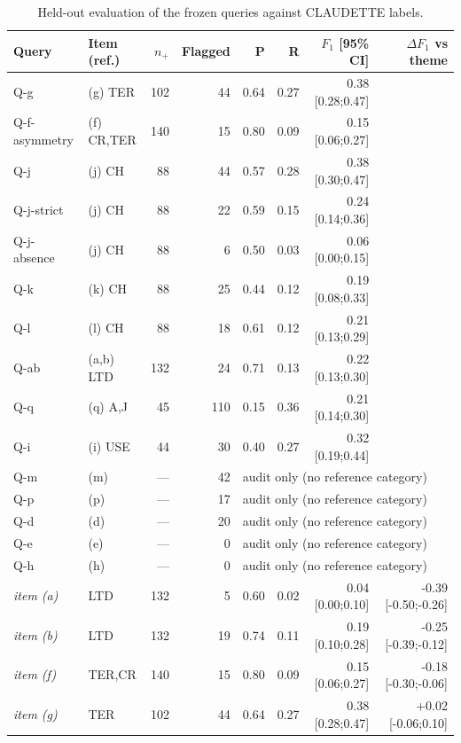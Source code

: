 \begin{table}[t]
\caption{Held-out evaluation of the frozen queries against CLAUDETTE labels.}
\label{tab:queries}
\centering
\footnotesize\setlength{\tabcolsep}{3.5pt}
\begin{tabular}{@{}llrrrrrr@{}}
\toprule
Query & Item (ref.) & $n_+$ & Flagged & P & R & $F_1$ [95\% CI] & $\Delta F_1$ vs theme \\
\midrule
Q-g & (g) TER & 102 & 44 & 0.64 & 0.27 & 0.38 [0.28;0.47] & \\
Q-f-asymmetry & (f) CR,TER & 140 & 15 & 0.80 & 0.09 & 0.15 [0.06;0.27] & \\
Q-j & (j) CH & 88 & 44 & 0.57 & 0.28 & 0.38 [0.30;0.47] & \\
Q-j-strict & (j) CH & 88 & 22 & 0.59 & 0.15 & 0.24 [0.14;0.36] & \\
Q-j-absence & (j) CH & 88 & 6 & 0.50 & 0.03 & 0.06 [0.00;0.15] & \\
Q-k & (k) CH & 88 & 25 & 0.44 & 0.12 & 0.19 [0.08;0.33] & \\
Q-l & (l) CH & 88 & 18 & 0.61 & 0.12 & 0.21 [0.13;0.29] & \\
Q-ab & (a,b) LTD & 132 & 24 & 0.71 & 0.13 & 0.22 [0.13;0.30] & \\
Q-q & (q) A,J & 45 & 110 & 0.15 & 0.36 & 0.21 [0.14;0.30] & \\
Q-i & (i) USE & 44 & 30 & 0.40 & 0.27 & 0.32 [0.19;0.44] & \\
Q-m & (m) & --- & 42 & \multicolumn{4}{l}{audit only (no reference category)} \\
Q-p & (p) & --- & 17 & \multicolumn{4}{l}{audit only (no reference category)} \\
Q-d & (d) & --- & 20 & \multicolumn{4}{l}{audit only (no reference category)} \\
Q-e & (e) & --- & 0 & \multicolumn{4}{l}{audit only (no reference category)} \\
Q-h & (h) & --- & 0 & \multicolumn{4}{l}{audit only (no reference category)} \\
\midrule
\emph{item (a)} & LTD & 132 & 5 & 0.60 & 0.02 & 0.04 [0.00;0.10] & -0.39 [-0.50;-0.26] \\
\emph{item (b)} & LTD & 132 & 19 & 0.74 & 0.11 & 0.19 [0.10;0.28] & -0.25 [-0.39;-0.12] \\
\emph{item (f)} & TER,CR & 140 & 15 & 0.80 & 0.09 & 0.15 [0.06;0.27] & -0.18 [-0.30;-0.06] \\
\emph{item (g)} & TER & 102 & 44 & 0.64 & 0.27 & 0.38 [0.28;0.47] & +0.02 [-0.06;0.10] \\

\end{tabular}
\end{table}
